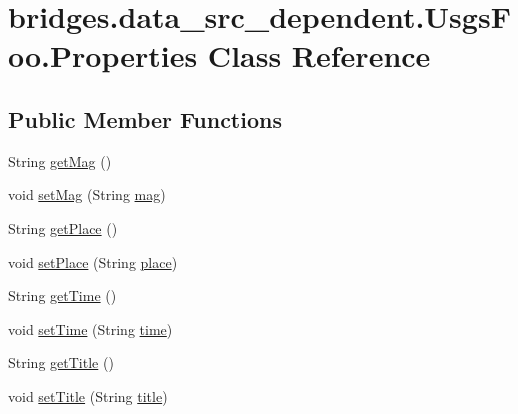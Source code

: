 \hypertarget{classbridges_1_1data__src__dependent_1_1_usgs_foo_1_1_properties}{}\section{bridges.\+data\+\_\+src\+\_\+dependent.\+Usgs\+Foo.\+Properties Class Reference}
\label{classbridges_1_1data__src__dependent_1_1_usgs_foo_1_1_properties}
\subsection*{Public Member Functions}
\begin{DoxyCompactItemize}
\item 
String \hyperlink{classbridges_1_1data__src__dependent_1_1_usgs_foo_1_1_properties_a9dcb3ec22a3aaa828d79c7a41b1d9685}{get\+Mag} ()
\item 
void \hyperlink{classbridges_1_1data__src__dependent_1_1_usgs_foo_1_1_properties_aac22cfb93d78259f098f4f996313429c}{set\+Mag} (String \hyperlink{classbridges_1_1data__src__dependent_1_1_usgs_foo_1_1_properties_a114163b5773ae63dc7554d0fb365f540}{mag})
\item 
String \hyperlink{classbridges_1_1data__src__dependent_1_1_usgs_foo_1_1_properties_ae97633cdfd1a3c6420ea7c38ed4155a2}{get\+Place} ()
\item 
void \hyperlink{classbridges_1_1data__src__dependent_1_1_usgs_foo_1_1_properties_a62e8d04129240c4f04b880ab2fef1f04}{set\+Place} (String \hyperlink{classbridges_1_1data__src__dependent_1_1_usgs_foo_1_1_properties_a78104fd6df6eec29b1598669127df9ed}{place})
\item 
String \hyperlink{classbridges_1_1data__src__dependent_1_1_usgs_foo_1_1_properties_abf80c8378da2b28708f49e9cf5bdf2d8}{get\+Time} ()
\item 
void \hyperlink{classbridges_1_1data__src__dependent_1_1_usgs_foo_1_1_properties_a846ac9ec8c49cd261a7dec80844fef27}{set\+Time} (String \hyperlink{classbridges_1_1data__src__dependent_1_1_usgs_foo_1_1_properties_a6e42210e723e44d15bcea954ccd6b579}{time})
\item 
String \hyperlink{classbridges_1_1data__src__dependent_1_1_usgs_foo_1_1_properties_a730443f40e47ba5ca0ed1c7005153ed2}{get\+Title} ()
\item 
void \hyperlink{classbridges_1_1data__src__dependent_1_1_usgs_foo_1_1_properties_aa22752d66c3427eac4559a24a79a6cd8}{set\+Title} (String \hyperlink{classbridges_1_1data__src__dependent_1_1_usgs_foo_1_1_properties_a8ffe112286f04d57850831222e1c50d6}{title})

\end{DoxyCompactItemize}
